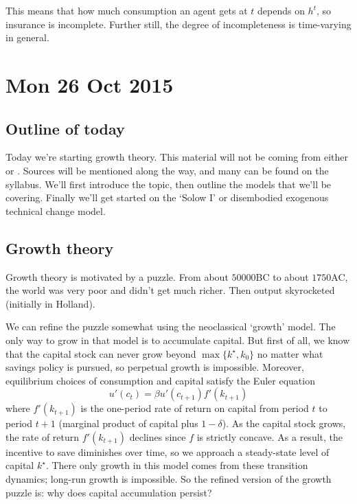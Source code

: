 \documentclass[11pt,letterpaper,reqno,oneside]{article}
\begin{document}
This means that how much consumption an agent gets at $t$ depends on $h^t$, so insurance is incomplete. Further still, the degree of incompleteness is time-varying in general.



\pagebreak
\section{Mon 26 Oct 2015}
\label{sec:26Oct2015}


\subsection{Outline of today}
\label{sec:26Oct2015:outline_of_today}

Today we're starting growth theory. This material will not be coming from either \textcite{StokeyLucasPrescott1989} or \textcite{LjungqvistSargent2012}. Sources will be mentioned along the way, and many can be found on the syllabus. We'll first introduce the topic, then outline the models that we'll be covering. Finally we'll get started on the `Solow I' or disembodied exogenous technical change model.



\subsection{Growth theory}
\label{sec:26Oct2015:growth_theory}

Growth theory is motivated by a puzzle. From about $50000$BC to about $1750$AC, the world was very poor and didn't get much richer. Then output skyrocketed (initially in Holland).

We can refine the puzzle somewhat using the neoclassical `growth' model. The only way to grow in that model is to accumulate capital. But first of all, we know that the capital stock can never grow beyond $\max\{ k^\star, k_0 \}$ no matter what savings policy is pursued, so perpetual growth is impossible. Moreover, equilibrium choices of consumption and capital satisfy the Euler equation
%
\begin{equation*}
	u'(c_t) = \beta u'(c_{t+1}) f'(k_{t+1})
\end{equation*}
%
where $f'(k_{t+1})$ is the one-period rate of return on capital from period $t$ to period $t+1$ (marginal product of capital plus $1-\delta$). As the capital stock grows, the rate of return $f'(k_{t+1})$ declines since $f$ is strictly concave. As a result, the incentive to save diminishes over time, so we approach a steady-state level of capital $k^\star$. There only growth in this model comes from these transition dynamics; long-run growth is impossible. So the refined version of the growth puzzle is: why does capital accumulation persist?
\end{document}
